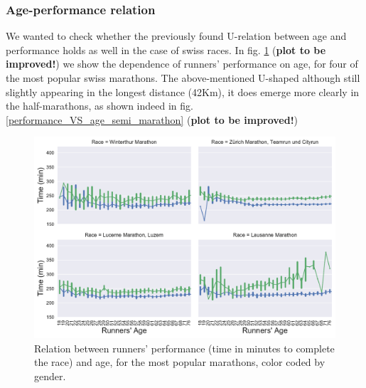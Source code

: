 \documentclass[fleqn,10pt]{wlscirep}
\begin{document}
		\subsubsection*{Age-performance relation}
		
		
			We wanted to check whether the previously found	\cite{connick2015relative,knechtle2014relationship,lara2014relationship,lehto2016effects}
			U-relation between age and performance holds as well in the case of swiss races. 
			In fig. \ref{performance_VS_age_marathon} 
			(\textbf{plot to be improved!}) 
			we show the dependence of runners' performance on age, for four of the most popular swiss marathons. 
			The above-mentioned U-shaped although still slightly appearing in the longest distance (42Km), it does emerge more clearly in the half-marathons, as  shown indeed in fig. \ref{performance_VS_age_semi_marathon}
			(\textbf{plot to be improved!}) 
			
			
			\begin{figure}[h]	
		
				\centering
				
				\includegraphics[scale=0.6]{../data_analysis/plots_for_paper/performance_VS_age_marathon.pdf}
				
				
				\caption{Relation between runners' performance (time in minutes to complete the race) and age, for the most popular marathons, color coded by gender.}
				
				\label{performance_VS_age_marathon}
		
			\end{figure}								
		
\end{document}
